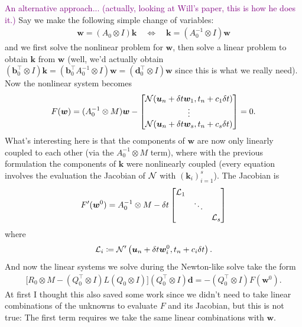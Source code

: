 \documentclass[review]{siamart}
\newcommand{\tcp}{\textcolor{purple}}
\begin{document}
\tcp{An alternative approach... (actually, looking at Will's paper, this is how he does it.)}
Say we make the following simple change of variables:
\begin{align}
\bm{w} = (A_0 \otimes I) \bm{k} 
\quad 
\Longleftrightarrow 
\quad
\bm{k} = (A_0^{-1} \otimes I) \bm{w}
\end{align}
and we first solve the nonlinear problem for $\bm{w}$, then solve a linear problem to obtain $\bm{k}$ from $\bm{w}$ (well, we'd actually obtain $(\bm{b}_0^\top \otimes I) \bm{k} = (\bm{b}_0^\top A_0^{-1} \otimes I) \bm{w} = (\bm{d}_0^\top \otimes I) \bm{w}$ since this is what we really need). Now the nonlinear system becomes
\begin{align}
F(\bm{w}) = ( A_0^{-1} \otimes M ) \bm{w} - 
\begin{bmatrix}
{\cal N}(\bm{u}_{n} + \delta t \bm{w}_1, t_n + c_1 \delta t)\\
\vdots\\
{\cal N}(\bm{u}_{n} + \delta t \bm{w}_s, t_n + c_s \delta t)\\
\end{bmatrix}
= 
0.
\end{align}
What's interesting here is that the components of $\bm{w}$ are now only linearly coupled to each other (via the $A_0^{-1} \otimes M$ term), where with the previous formulation the components of $\bm{k}$ were nonlinearly coupled (every equation involves the evaluation the Jacobian of ${\cal N}$ with $(\bm{k}_i)_{i =1}^s$). The Jacobian is
\begin{align}
F'(\bm{w}^0) = A_0^{-1} \otimes M - 
\delta t
\begin{bmatrix} {\cal L}_1 \\ 
& \ddots \\ 
& & {\cal L}_s
\end{bmatrix}
\end{align}
where
\begin{align}
{\cal L}_i \coloneqq {\cal N}' \left(\bm{u}_n + \delta t \bm{w}_i^0, t_n + c_i \delta t \right).
\end{align}
And now the linear systems we solve during the Newton-like solve take the form
\begin{align}
\big[ R_0 \otimes M - (Q_0^\top \otimes  I) L  (Q_0 \otimes I) \big] 
(Q_0^\top \otimes I) \bm{d} = - (Q_0^\top \otimes I) F( \bm{w}^0).
\end{align}
At first I thought this also saved some work since we didn't need to take linear combinations of the unknowns to evaluate $F$ and its Jacobian, but this is not true: The first term requires we take the same linear combinations with $\bm{w}$.
\end{document}
